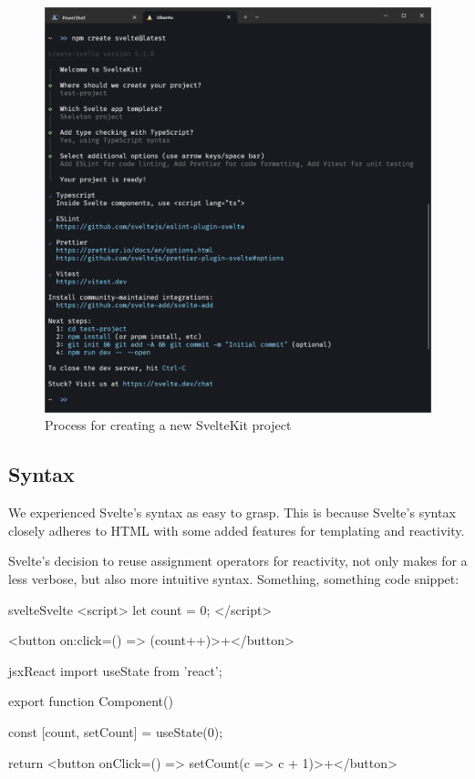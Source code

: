 \begin{figure}
    \centering
    \includegraphics[width=.95\linewidth,trim={0 15cm 0 1.5cm},clip]{assets/sveltekit-project-setup}
    \caption{Process for creating a new SvelteKit project}
    \label{fig:project-setup}
\end{figure}

\subsection{Syntax}

We experienced Svelte's syntax as easy to grasp. This is because Svelte's syntax closely adheres to HTML with some added features for templating and reactivity.

Svelte's decision to reuse assignment operators for reactivity, not only makes for a less verbose, but also more intuitive syntax. Something, something code snippet:

\begin{myminted}{svelte}{Svelte}
<script>
    let count = 0;
</script>

<button on:click={() => (count++)}>+</button>
\end{myminted}

\begin{myminted}{jsx}{React}
import { useState } from 'react';

export function Component() {
    const [count, setCount] = useState(0);

    return <button onClick={() => setCount(c => c + 1)}>+</button>
}
\end{myminted}

